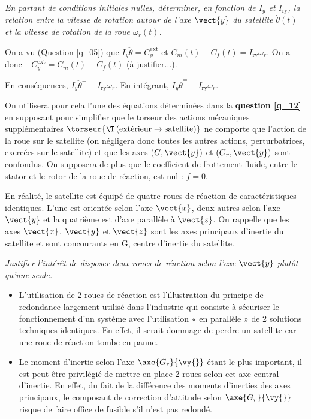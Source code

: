 \question{\label{q_14}}\textit{
  En partant de conditions initiales nulles, déterminer, en fonction de
  $I_y$ et $I_{\text{ry}}$, la relation entre la vitesse de rotation autour de l'axe $\vect{y}$ du
  satellite $\dot{\theta}(t)$ et la vitesse de rotation de la roue $\omega_r(t)$.}
  \ifprof
\begin{corrige}
On a vu (Question \ref{q_05}) que $I_y \ddot{\theta} = C_y^{\text{ext}}$ et 
$C_m(t)-C_f(t) = I_{\text{ry}}\dot{\omega}_r$. On a donc $- C_y^{\text{ext}} = C_m(t)-C_f(t)$ (à justifier...). 

En conséquences, $I_y \ddot{\theta} ^= - I_{\text{ry}}\dot{\omega}_r$. En intégrant, 
$I_y \dot{\theta} ^= - I_{\text{ry}}\omega_r$.
\end{corrige}
\else
\fi

  \ifprof
\else

   On utilisera pour cela l'une des équations déterminées dans la \textbf{question \ref{q_12}} en supposant pour simplifier que le torseur des actions mécaniques supplémentaires $\torseur{\T\left(\text{extérieur}\to \text{satellite}\right)}$
  ne comporte que l'action de la roue sur le satellite (on négligera
  donc toutes les autres actions, perturbatrices, exercées sur le
  satellite) et que les axes $\left(G,\vect{y}\right)$ et $\left(G_r,\vect{y}\right)$ sont confondus. On supposera de plus que
  le coefficient de frottement fluide, entre le stator et le rotor de la
  roue de réaction, est nul : $f=0$.

En réalité, le satellite est équipé de quatre roues de réaction de
caractéristiques identiques. L'une est orientée selon l'axe $\vect{x}$, deux autres
selon l'axe $\vect{y}$ et la quatrième est d'axe parallèle à $\vect{z}$. On rappelle que les axes $\vect{x}$, $\vect{y}$ et $\vect{z}$ sont les axes principaux d'inertie du satellite et sont concourants en G, centre d'inertie du satellite.
\fi

\question{\label{q_15}}\textit{ Justifier l'intérêt de disposer deux roues de réaction selon
  l'axe $\vect{y}$ plutôt qu'une seule.}
\ifprof
\begin{corrige}
\begin{itemize}
\item L’utilisation de 2 roues de réaction est l’illustration du principe de redondance
largement utilisé dans l’industrie qui consiste à sécuriser le fonctionnement d’un
système avec l’utilisation « en parallèle » de 2 solutions techniques identiques. En
effet, il serait dommage de perdre un satellite car une roue de réaction tombe en panne.
\item Le moment d’inertie selon l’axe $\axe{G_r}{\vy{}}$ étant le plus important, il est peut-être
privilégié de mettre en place 2 roues selon cet axe central d’inertie. En effet, du fait de
la différence des moments d’inerties des axes principaux, le composant de correction
d’attitude selon $\axe{G_r}{\vy{}}$ risque de faire office de fusible s’il n’est pas redondé.
\end{itemize}
\end{corrige}
\else
\fi

